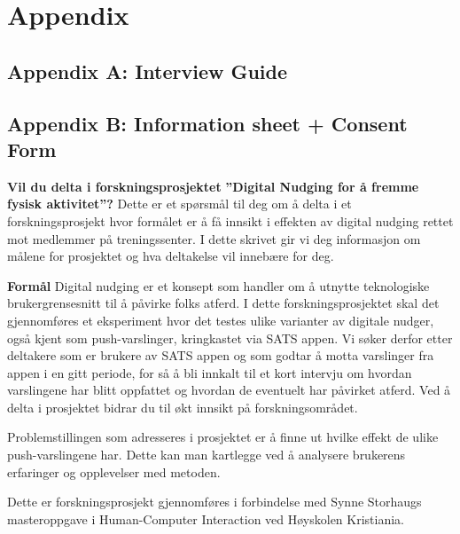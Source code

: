 \chapter*{Appendix}

\section{Appendix A: Interview Guide}

\section{Appendix B: Information sheet + Consent Form}




%
%


%

\textbf{Vil du delta i forskningsprosjektet} \textbf{”Digital Nudging for å fremme fysisk aktivitet”?}
 \bigbreak
Dette er et spørsmål til deg om å delta i et forskningsprosjekt hvor formålet er å få innsikt i effekten av digital nudging rettet mot medlemmer på treningssenter. I dette skrivet gir vi deg informasjon om målene for prosjektet og hva deltakelse vil innebære for deg.
 
\textbf{Formål}
\bigbreak
Digital nudging er et konsept som handler om å utnytte teknologiske brukergrensesnitt til å påvirke folks atferd. I dette forskningsprosjektet skal det gjennomføres et eksperiment hvor det testes ulike varianter av digitale nudger, også kjent som push-varslinger, kringkastet via SATS appen. Vi søker derfor etter deltakere som er brukere av SATS appen og som godtar å motta varslinger fra appen i en gitt periode, for så å bli innkalt til et kort intervju om hvordan varslingene har blitt oppfattet og hvordan de eventuelt har påvirket atferd. Ved å delta i prosjektet bidrar du til økt innsikt på forskningsområdet. 
\bigbreak

Problemstillingen som adresseres i prosjektet er å finne ut hvilke effekt de ulike push-varslingene har. Dette kan man kartlegge ved å analysere brukerens erfaringer og opplevelser med metoden. 
\bigbreak

Dette er forskningsprosjekt gjennomføres i forbindelse med Synne Storhaugs masteroppgave i Human-Computer Interaction ved Høyskolen Kristiania.
\bigbreak
 
